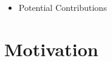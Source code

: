 \begin{itemize}
\item Potential Contributions
\end{itemize}

\section{Motivation}
\begin{comment}
FRANCESA
The lack of psychological aspects in usual current User Models and Profiles has motivated this
Thesis. Nowadays profiles with personal psychological details are not the main concern for web
system designers and programmers. Some research has been made by Affective Computing
scientists focusing mainly on the identification and modelling of user’s Emotions [RHR98],
[OCC88], [Ort02], [Lis02], [ZC03], [Pic00], [Pic97], [Pic02], [LTC+00], [Ell92], [Pai00].
Recently, studies from [Dam94], [Dam99], [Sim83], [Gol95], [Pai00], [Pic97], [Pic00], [Pic02],
[TPP03], [Tha06] have demonstrated how important psychological aspects of people such as
Personality Traits and Emotions are during the human decision-making process. Human Emotion and their models have already been largely implemented in computers, much more than Personality 

VINA
Testing tools are usually built on top of HLL VMs. As a result, they often end up tampering with the emergent computation. Usually, the additional layers between the program
under test and the underlying HLL VM introduced by testing tools can have a pernicious
effect on the emergent computation. Furthermore, during run time, when tools need to
carry out computations about themselves (or the program under test) they must turn
to costly metaprogramming operations (e.g., reflection). To examine a running program,
for example, a tool has to perform introspection operations (i.e., inspecting state and
structure). Likewise, to change the behavior or structure of the program under test during
run time, tools have to resort to intercession (Lee and Zachary, 1995).
Apart from the overhead incurred by reflective operations, tools that implement weak
mutation rely heavily on state storage and retrieval. By storing state information these
tools factor out the expense of running all mutants from the beginning. Nevertheless, such
computational savings are only possible at the expense of a significantly larger memory
footprint (Fleyshgakker and Weiss, 1994).
\end{comment}


